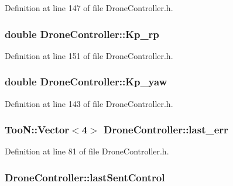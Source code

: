 Definition at line 147 of file Drone\-Controller.\-h.

\subsubsection[{Kp\-\_\-rp}]{\setlength{\rightskip}{0pt plus 5cm}double Drone\-Controller\-::\-Kp\-\_\-rp}\label{classDroneController_a089601f41d62e473b4b041ebca9fed42}


Definition at line 151 of file Drone\-Controller.\-h.

\subsubsection[{Kp\-\_\-yaw}]{\setlength{\rightskip}{0pt plus 5cm}double Drone\-Controller\-::\-Kp\-\_\-yaw}\label{classDroneController_a7a1cf2b24cd7b0d728e5120bd837b121}


Definition at line 143 of file Drone\-Controller.\-h.

\subsubsection[{last\-\_\-err}]{\setlength{\rightskip}{0pt plus 5cm}Too\-N\-::\-Vector$<$4$>$ Drone\-Controller\-::last\-\_\-err\hspace{0.3cm}{\ttfamily [private]}}\label{classDroneController_a12a9b8b9b607ca0d4d6212cbd578b511}


Definition at line 81 of file Drone\-Controller.\-h.

\subsubsection[{last\-Sent\-Control}]{ Drone\-Controller\-::last\-Sent\-Control\hspace{0.3cm}{\ttfamily [private]}}\label{classDroneController_abf751360fed2ff00bd711849a90a53d0}


